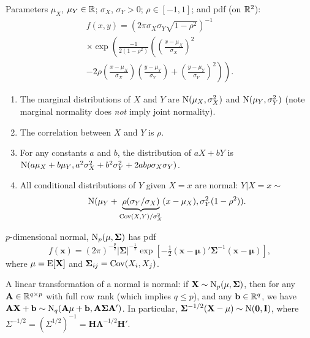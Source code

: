 \documentclass[8pt,letterpaper, landscape]{extarticle} %
\newcommand{\mA}{\ensuremath{\mathbf{A}}}
\newcommand{\mX}{\ensuremath{\mathbf{X}}}
\newcommand{\mx}{\ensuremath{\mathbf{x}}}
\newcommand{\mI}{\ensuremath{\mathbf{I}}}
\newcommand{\mmu}{\ensuremath{\mathbf{\mu}}}
\newcommand{\mSigma}{\ensuremath{\mathbf{\Sigma}}}
\newcommand{\mzero}{\ensuremath{\mathbf{0}}}
\begin{document}
\begin{multicols}{3}
\begin{description}
 Parameters $ \mu_X $, $ \mu_Y \in \mathbb{R} $; $ \sigma_X $, $ \sigma_Y > 0 $; $ \rho \in [-1,1] $; and pdf (on $ \mathbb{R}^2 $):
\begin{multline*}
f(x,y) = \left( 2 \pi \sigma_X \sigma_Y \sqrt{1 - \rho^2} \right)^{-1} \\
\times \exp \left( \frac{-1}{2(1 - \rho^2)} \left( \left( \frac{x - \mu_X}{\sigma_X} \right)^2 \right. \right. \\
\left. \left. - 2 \rho \left( \frac{x - \mu_X}{\sigma_X} \right) \left( \frac{y - \mu_Y}{\sigma_Y} \right) + \left( \frac{y - \mu_Y}{\sigma_Y} \right)^2 \right) \right).
\end{multline*}
\begin{enumerate}
\item The marginal distributions of $ X $ and $ Y $ are $ \operatorname{N} (\mu_X, \sigma_X^2) $ and $ \operatorname{N} (\mu_Y, \sigma_Y^2) $ (note marginal normality does \textit{not} imply joint normality).
\item The correlation between $ X $ and $ Y $ is $ \rho $.
\item For any constants $ a $ and $ b $, the distribution of $ a X + bY $ is $ \operatorname{N} (a \mu_X + b \mu_Y, a^2 \sigma_X^2 + b^2 \sigma_Y^2 + 2ab\rho \sigma_X \sigma_Y) $.
\item All conditional distributions of $ Y $ given $ X = x $ are normal: $ Y | X=x \sim $
$$ \operatorname{N} (\mu_Y + \underbrace{ \rho (\sigma_Y / \sigma_X)}_{\operatorname{Cov} (X,Y) / \sigma^2_X} (x - \mu_X), \sigma_Y^2 (1 - \rho^2)) .$$
\end{enumerate}

 $ p $-dimensional normal, $ \operatorname{N}_p (\mathbf{\mu}, \mathbf{\Sigma}) $ has pdf
$$ f(\mx) = (2 \pi)^{-\frac{p}{2}} | \mathbf{\Sigma} |^{-\frac{1}{2}} \exp \left[ -\tfrac{1}{2} (\mx - \mathbf{\mu})' \mathbf{\Sigma}^{-1} (\mx - \mathbf{\mu}) \right], $$
where $ \mathbf{\mu} = \E [\mX] $ and $ \mathbf{\Sigma}_{ij} = \operatorname{Cov} (X_i, X_j) $.

A linear transformation of a normal is normal: if $ \mX \sim \n_p (\mmu, \mSigma) $, then for any $ \mA \in \R^{q \times p} $ with full row rank (which implies $ q \leq p $), and any $ \mathbf{b} \in \mathbb{R}^q $, we have $ \mA \mX + \mathbf{b} \sim \n_q (\mA \mmu + \mathbf{b} , \mA \mSigma \mA' ) $. In particular, $ \mSigma^{-1/2} (\mX - \mmu) \sim \n (\mzero, \mI) $, where $ \Sigma^{-1/2} = (\Sigma^{1/2})^{-1} = \mathbf{H} \mathbf{\Lambda}^{-1/2} \mathbf{H}' $.


\end{description}
\end{multicols}
\end{document}
